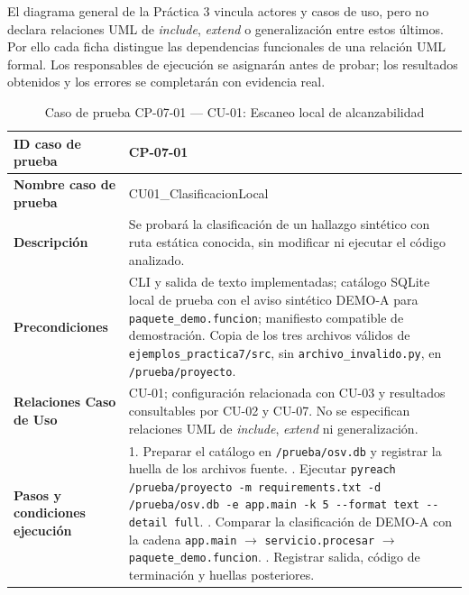El diagrama general de la Práctica 3 vincula actores y casos de uso, pero no declara relaciones UML de \textit{include}, \textit{extend} o generalización entre estos últimos. Por ello cada ficha distingue las dependencias funcionales de una relación UML formal. Los responsables de ejecución se asignarán antes de probar; los resultados obtenidos y los errores se completarán con evidencia real.
\clearpage
\begin{table}[H]
\centering\small{}
\renewcommand{\arraystretch}{1.15}
\caption{Caso de prueba CP-07-01 --- CU-01: Escaneo local de alcanzabilidad}
\label{p7:tab:cp07_01}
\begin{tabularx}{\textwidth}{|P{4.15cm}|Y|}
\hline
\textbf{ID caso de prueba} & CP-07-01 \\ \hline
\textbf{Nombre caso de prueba} & CU01\_\allowbreak ClasificacionLocal \\ \hline
\textbf{Descripción} & Se probará la clasificación de un hallazgo sintético con ruta estática conocida, sin modificar ni ejecutar el código analizado. \\ \hline
\textbf{Precondiciones} & CLI y salida de texto implementadas; catálogo SQLite local de prueba con el aviso sintético DEMO-A para \texttt{paquete\_\allowbreak demo.\allowbreak funcion}; manifiesto compatible de demostración. Copia de los tres archivos válidos de \texttt{ejemplos\_\allowbreak practica7/\allowbreak src}, sin \texttt{archivo\_\allowbreak invalido.\allowbreak py}, en \texttt{/\allowbreak prueba/\allowbreak proyecto}. \\ \hline
\textbf{Relaciones Caso de Uso} & CU-01; configuración relacionada con CU-03 y resultados consultables por CU-02 y CU-07. No se especifican relaciones UML de \textit{include}, \textit{extend} ni generalización. \\ \hline
\textbf{Pasos y condiciones ejecución} & 1. Preparar el catálogo en \texttt{/\allowbreak prueba/\allowbreak osv.\allowbreak db} y registrar la huella de los archivos fuente. . Ejecutar \texttt{pyreach /\allowbreak prueba/\allowbreak proyecto -\allowbreak m requirements.\allowbreak txt -\allowbreak d /\allowbreak prueba/\allowbreak osv.\allowbreak db -\allowbreak e app.\allowbreak main -\allowbreak k 5 -\allowbreak -\allowbreak format text -\allowbreak -\allowbreak detail full}. . Comparar la clasificación de DEMO-A con la cadena \texttt{app.\allowbreak main} $\rightarrow$ \texttt{servicio.\allowbreak procesar} $\rightarrow$ \texttt{paquete\_\allowbreak demo.\allowbreak funcion}. . Registrar salida, código de terminación y huellas posteriores. \\ \hline

\end{tabularx}
\end{table}
